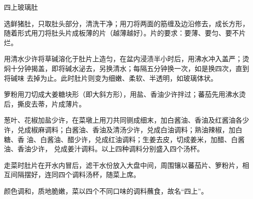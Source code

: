 \begin{recipe}{四上玻璃肚}

\ingredients


\preparation

\step 选鲜猪肚，只取肚头部分，清洗干净；用刀将两面的筋缠及边沿修去，成长方形，
随着形式用刀将肚头片成板薄的片（越薄越好）。片的要求：要薄、要匀、要不片烂。

\step 用清水少许将草碱溶化于肚片上造匀，在盆内浸渍半小时后，用沸水冲入盖严；烫
焖十分钟揭盖，即将碱水泌去，另换清水；每隔五分钟换一次，如是换四次，直到将碱味
去掉为止。此时肚片则变为细嫩、柔软、半透明，如玻璃体状。

\step 箩粉用刀切成大姜糖块形（即大斜方形），用盐、香油少许拌过；蕃茄先用沸水烫
后，撕皮去蒂，片成薄片。

\step 葱叶、花椒加盐少许，在菜墩上用刀共同铡成细末，加白酱油、香油及红酱油各少
许，兑成椒麻调料；白酱油、香油及清汤少许，兑成白油调料；熟油辣椒，加白糖、香
油、白酱油、醋少许，兑成红油调料；生姜去皮，切成姜米，加醋、白酱油、香油少许，
兑成姜汁调料。以上四种调料分别盛入四个汤杯。

\step 走菜时肚片在开水内冒后，滤干水份放入大盘中间，周围镶以蕃茄片、箩粉片，相
互间隔摆好，连同四个调料汤杯，随菜上席。

\features

颜色调和，质地脆嫩，菜以四个不同口味的调料蘸食，故名“四上”。

\end{recipe}

